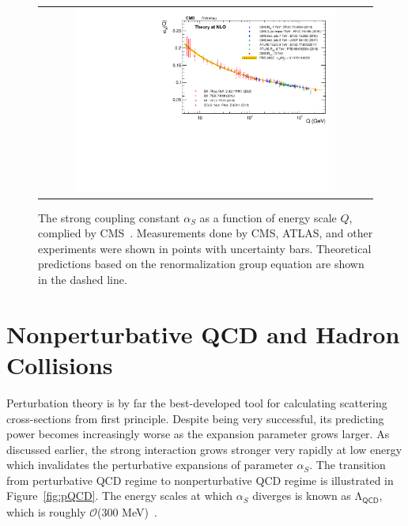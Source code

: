 \begin{figure}[tbh!]
 \begin{center}
 \begin{tabular}{c}
 \includegraphics[width=0.8\textwidth]{figures/Part1/QCD/alphaS}
 \end{tabular}
 \caption{The strong coupling constant $\alpha_{S}$ as a function of energy scale $Q$, complied by \ac{CMS}~\cite{cms:twiki}. Measurements done by \ac{CMS}, \ac{ATLAS}, and other experiments were shown in points with uncertainty bars. Theoretical predictions based on the renormalization group equation are shown in the dashed line.}
 \label{fig:alphaS}
 \end{center}
\end{figure}

\section{Nonperturbative QCD and Hadron Collisions}
\label{sec:Collision}

Perturbation theory is by far the best-developed tool for calculating scattering cross-sections from first principle. Despite being very successful, its predicting power becomes increasingly worse as the expansion parameter grows larger. As discussed earlier, the strong interaction grows stronger very rapidly at low energy which invalidates the perturbative expansions of parameter $\alpha_{S}$. The transition from perturbative \ac{QCD} regime to nonperturbative \ac{QCD} regime is illustrated in Figure~\ref{fig:pQCD}. The energy scales at which $\alpha_{S}$ diverges is known as $\mathrm{\Lambda}_{\textsf{QCD}}$, which is roughly $\mathcal{O}$(300 MeV)~\cite{Deur:2016tte}.

